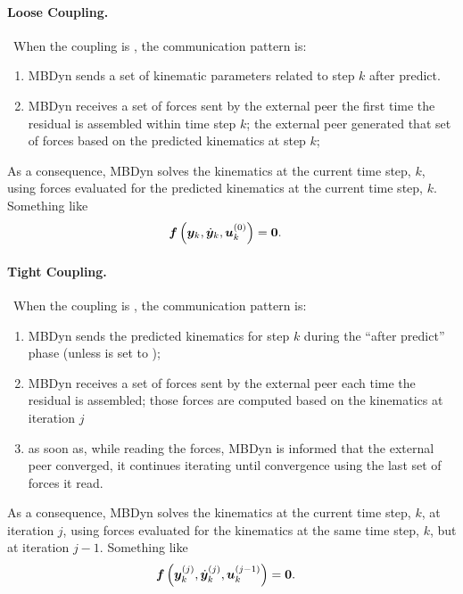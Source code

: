 \paragraph{Loose Coupling.} \
When the coupling is , the communication pattern is:
\begin{enumerate}
\item MBDyn sends a set of kinematic parameters related to step $k$
	after predict.

\item MBDyn receives a set of forces sent by the external peer
	the first time the residual is assembled within time step $k$;
	the external peer generated that set of forces
	based on the predicted kinematics at step $k$;
\end{enumerate}
As a consequence, MBDyn solves the kinematics at the current time step, $k$,
using forces evaluated for the predicted kinematics at the current time step, $k$.
Something like
\begin{align}
	\boldsymbol{f}\left( \boldsymbol{y}_k, \dot{\boldsymbol{y}}_k, \boldsymbol{u}_{k}^{(0)} \right)
	&=
	\boldsymbol{0}
	.
\end{align}

\paragraph{Tight Coupling.} \
When the coupling is , the communication pattern is:
\begin{enumerate}
\item MBDyn sends the predicted kinematics for step $k$
	during the ``after predict'' phase
	(unless \kw{send after predict} is set to \kw{no});

\item MBDyn receives a set of forces sent by the external peer
	each time the residual is assembled; those forces are computed
	based on the kinematics at iteration $j$

\item as soon as, while reading the forces, MBDyn is informed that
	the external peer converged, it continues iterating until
	convergence using the last set of forces it read.

\end{enumerate}
As a consequence, MBDyn solves the kinematics at the current time step, $k$,
at iteration $j$,
using forces evaluated for the kinematics at the same time step, $k$,
but at iteration $j-1$.
Something like
\begin{align}
	\boldsymbol{f}\left( \boldsymbol{y}_k^{(j)}, \dot{\boldsymbol{y}}_k^{(j)}, \boldsymbol{u}_k^{(j-1)} \right)
	&=
	\boldsymbol{0}
	.
\end{align}




